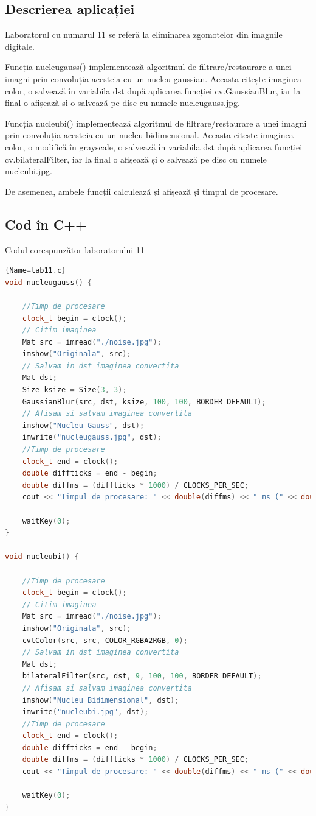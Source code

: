 \documentclass{amsart}
\begin{document}
\subsection{Descrierea aplicației}
\par
Laboratorul cu numarul 11 se referă la eliminarea zgomotelor din imagnile digitale.
\\ \par
Funcția nucleugauss() implementează algoritmul de filtrare/restaurare a unei imagni prin convoluția acesteia cu un nucleu gaussian. Aceasta citește imaginea color, o salvează în variabila dst după aplicarea funcției cv.GaussianBlur, iar la final o afișează și o salvează pe disc cu numele nucleugauss.jpg.
\\ \par
Funcția nucleubi() implementează algoritmul de filtrare/restaurare a unei imagni prin convoluția acesteia cu un nucleu bidimensional. Aceasta citește imaginea color, o modifică în grayscale, o salvează în variabila dst după aplicarea funcției cv.bilateralFilter, iar la final o afișează și o salvează pe disc cu numele nucleubi.jpg.
\\ \par
De asemenea, ambele funcții calculează și afișează și timpul de procesare.

\subsection{Cod \^{i}n C++}

Codul corespunzător laboratorului 11

\begin{lstlisting}[language=C++]{Name=lab11.c}
void nucleugauss() {

	//Timp de procesare
	clock_t begin = clock();
	// Citim imaginea
	Mat src = imread("./noise.jpg");
	imshow("Originala", src);
	// Salvam in dst imaginea convertita
	Mat dst;
	Size ksize = Size(3, 3);
	GaussianBlur(src, dst, ksize, 100, 100, BORDER_DEFAULT);
	// Afisam si salvam imaginea convertita
	imshow("Nucleu Gauss", dst);
	imwrite("nucleugauss.jpg", dst);
	//Timp de procesare
	clock_t end = clock();
	double diffticks = end - begin;
	double diffms = (diffticks * 1000) / CLOCKS_PER_SEC;
	cout << "Timpul de procesare: " << double(diffms) << " ms (" << double(diffms) / 1000 << " sec) \n\n";

	waitKey(0);
}

void nucleubi() {

	//Timp de procesare
	clock_t begin = clock();
	// Citim imaginea
	Mat src = imread("./noise.jpg");
	imshow("Originala", src);
	cvtColor(src, src, COLOR_RGBA2RGB, 0);
	// Salvam in dst imaginea convertita
	Mat dst;
	bilateralFilter(src, dst, 9, 100, 100, BORDER_DEFAULT);
	// Afisam si salvam imaginea convertita
	imshow("Nucleu Bidimensional", dst);
	imwrite("nucleubi.jpg", dst);
	//Timp de procesare
	clock_t end = clock();
	double diffticks = end - begin;
	double diffms = (diffticks * 1000) / CLOCKS_PER_SEC;
	cout << "Timpul de procesare: " << double(diffms) << " ms (" << double(diffms) / 1000 << " sec) \n\n";

	waitKey(0);
}
 \end{lstlisting}
\end{document}

